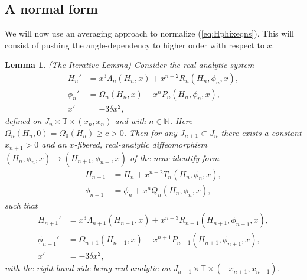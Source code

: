 \documentclass[reqno,12pt]{amsart}
\newcommand{\seclab}[1]{\label{sec:#1}}
\newcommand{\eqlab}[1]{\label{eq:#1}}
\renewcommand{\eqref}[1]{(\ref{eq:#1})}
\newcommand{\lemmalab}[1]{\label{lemma:#1}}
\newtheorem{lemma}[theorem]{Lemma}
\numberwithin{equation}{section}
\begin{document}
%  



\subsection{A normal form}\seclab{42}
We will now use an averaging approach to normalize \eqref{Hphixeqns}. This will consist of pushing the angle-dependency to higher order with respect to $x$. 

\begin{lemma}\lemmalab{Iterative}
 \textnormal{(The Iterative Lemma)}
 Consider the real-analytic system 
 \begin{equation}\eqlab{Hnphixeqns}
\begin{aligned}
 {H}_n' &= x^3 \Lambda_n(H_n,x)+x^{n+2} R_n(H_n,\phi_n,x),\\
 \phi_n' & = \Omega_n(H_n,x)+x^{n} P_n(H_n,\phi_n,x),\\
 x' &= -3\delta x^2,
\end{aligned}
\end{equation}
defined on $J_n\times \mathbb T\times (x_n,x_n)$ and with $n\in \mathbb N$. Here $\Omega_n(H_n,0)=\Omega_0(H_n)\ge c>0$. Then for any $J_{n+1}\subset J_n$ there exists a constant $x_{n+1}>0$ and an $x$-fibered, real-analytic diffeomorphism $(H_n,\phi_n,x)\mapsto (H_{n+1},\phi_{n+},x)$ of the near-identify form
\begin{align}
 H_{n+1} &= H_n + x^{n+2} T_n(H_n,\phi_n,x),\eqlab{Hn1}\\
 \phi_{n+1}&=\phi_n+x^{n} Q_n(H_n,\phi_n,x),\eqlab{phin1}
\end{align}
such that
 \begin{equation}\eqlab{Hn1phixeqns}
\begin{aligned}
 {H}_{n+1}' &= x^3 \Lambda_{n+1}(H_{n+1},x)+x^{n+3} R_{n+1}(H_{n+1},\phi_{n+1},x),\\
 \phi_{n+1}' & = \Omega_{n+1}(H_{n+1},x)+x^{n+1} P_{n+1}(H_{n+1},\phi_{n+1},x),\\
 x'&= -3\delta x^2,
\end{aligned}
\end{equation}
with the right hand side being real-analytic on $J_{n+1}\times \mathbb T\times (-x_{n+1},x_{n+1})$.
\end{lemma}
\end{document}
